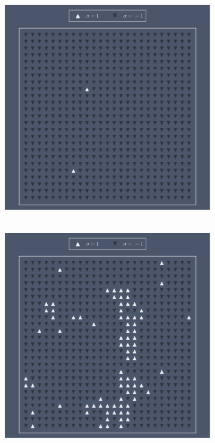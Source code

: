 \documentclass[main.tex]{subfiles}
\begin{document}
\begin{figure}[ht!]
    \centering
    \begin{subfigure}[c]{0.3\textwidth}
        \includegraphics[width=\textwidth]{imgs/hw7/system_T1_3.pdf}
        \caption{~}\label{fig9:finalStates_a}
    \end{subfigure}
    \begin{subfigure}[c]{0.3\textwidth}
        \includegraphics[width=\textwidth]{imgs/hw7/system_T2_3.pdf}

\end{subfigure}
\end{figure}
\end{document}
